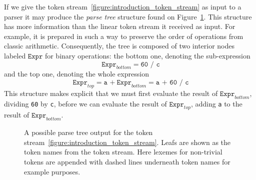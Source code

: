 \documentclass[
  oneside,
  english,
  coorientadorbanca,
  embeddedlogo,
  noabntexcite
]{ufsc-thesis-rn46-2019}
\newcommand{\code}[1]{\texttt{#1}}
\newcommand{\bnfvar}[1]{\ \bnfvars{#1}}
\newcommand{\bnfvars}[1]{\code{#1}}
\newcommand{\bnfters}[1]{\textrm{`}\code{#1}\textrm{'}}
\begin{document}
If we give the token stream~\eqref{figure:introduction_token_stream} as input to a parser it may produce the \textit{parse tree} structure found on Figure~\ref{figure:introduction_ast}.
This structure has more information than the linear token stream it received as input.
For example, it is prepared in such a way to preserve the order of operations from classic arithmetic.
Consequently, the tree is composed of two interior nodes labeled $\bnfvars{Expr}$ for binary operations: the bottom one, denoting the sub-expression
\begin{equation*}
  \bnfvar{Expr}_{bottom} = \code{60 / c}
\end{equation*}
and the top one, denoting the whole expression
\begin{equation*}
  \bnfvar{Expr}_{top} = \code{a +} \bnfvar{Expr}_{bottom} = \code{a + 60 / c}
\end{equation*}
This structure makes explicit that we must first evaluate the result of $\bnfvars{Expr}_{bottom}$, dividing \code{60} by \code{c}, before we can evaluate the result of $\bnfvars{Expr}_{top}$, adding \code{a} to the result of $\bnfvars{Expr}_{bottom}$.

\begin{figure}[ht]
  \centering
  \caption{
    A possible parse tree output for the token stream~\eqref{figure:introduction_token_stream}.
    Leafs are shown as the token names from the token stream.
    Here lexemes for non-trivial tokens are appended with dashed lines underneath token names for example purposes.
  }\label{figure:introduction_ast}
\end{figure}
\end{document}
